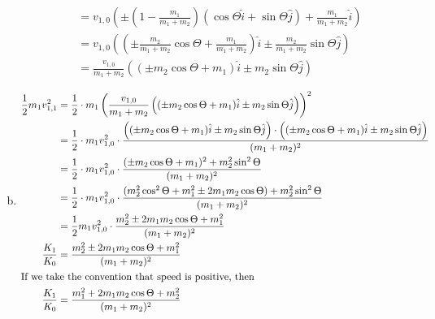 \documentclass{esg8012pset}
\begin{document}
\begin{solution}
\begin{enumerate}[a)]
\begin{align*}
    & = v_{1,0}\left(\pm \left(1 - \frac{m_1}{m_1 + m_2}\right)(\cos\Theta\hat i + \sin\Theta \hat j) + \frac{m_1}{m_1 + m_2}\hat i\right) \\
    & = v_{1,0}\left(\left(\pm \frac{m_2}{m_1 + m_2}\cos\Theta + \frac{m_1}{m_1 + m_2}\right)\hat i \pm\frac{m_2}{m_1 + m_2} \sin\Theta \hat j\right) \\
    & = \frac{v_{1,0}}{m_1 + m_2}\left((\pm m_2\cos\Theta + m_1)\hat i \pm m_2\sin\Theta \hat j\right)
    \end{align*}
    \item \begin{align*}
    \frac{1}{2}m_1 v_{1, 1}^2 & = \frac{1}{2}\cdot m_1 \left(\frac{v_{1,0}}{m_1 + m_2}\left((\pm m_2\cos\Theta + m_1)\hat i \pm m_2\sin\Theta \hat j\right)\right)^2 \\
    & = \frac{1}{2}\cdot m_1 v_{1,0}^2 \cdot \frac{\left((\pm m_2\cos\Theta + m_1)\hat i \pm m_2\sin\Theta \hat j\right)\cdot\left((\pm m_2\cos\Theta + m_1)\hat i \pm m_2\sin\Theta \hat j\right)}{(m_1 + m_2)^2} \\
    & = \frac{1}{2}\cdot m_1 v_{1,0}^2\cdot \frac{(\pm m_2\cos\Theta + m_1)^2 + m_2^2\sin^2\Theta }{(m_1 + m_2)^2} \\
    & = \frac{1}{2}\cdot m_1 v_{1,0}^2\cdot \frac{(m_2^2\cos^2\Theta + m_1^2 \pm 2 m_1 m_2\cos\Theta) + m_2^2\sin^2\Theta }{(m_1 + m_2)^2} \\
    & = \frac{1}{2} m_1 v_{1,0}^2\cdot \frac{m_2^2 \pm 2 m_1 m_2\cos\Theta + m_1^2}{(m_1 + m_2)^2} \\
    \frac{K_1}{K_0} & = \frac{m_2^2 \pm 2 m_1 m_2\cos\Theta + m_1^2}{(m_1 + m_2)^2} \\
    \intertext{If we take the convention that speed is positive, then}
    \frac{K_1}{K_0} & = \frac{m_1^2 + 2 m_1 m_2\cos\Theta + m_2^2}{(m_1 + m_2)^2}
    \end{align*}
  \end{enumerate}
\end{solution}
\end{document}
